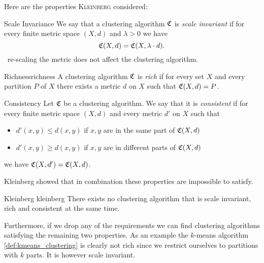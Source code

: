 Here are the properties \textsc{Kleinberg} considered:

\begin{definition}{Scale Invariance}{}
We say that a clustering algorithm $\mathfrak{C}$ is \emph{scale invariant} if for every finite metric space $(X,d)$ and $\lambda > 0$ we have
$$
\mathfrak{C}(X,d) = \mathfrak{C}(X, \lambda \cdot d).
$$
\Ie\ re-scaling the metric does not affect the clustering algorithm.
\end{definition}

\begin{definition}{Richness}{richness}
A clustering algorithm $\mathfrak{C}$ is \emph{rich} if for every set $X$ and every partition $P$ of $X$ there exists a metric $d$ on $X$ such that $\mathfrak{C}(X,d) = P$.
\end{definition}

\begin{definition}{Consistency}{}
Let $\mathfrak{C}$ be a clustering algorithm. We say that it is \emph{consistent} if for every finite metric space $(X,d)$ and every metric $d'$ on $X$ such that
\begin{itemize}
    \item $d'(x,y) \leq d(x,y)$ if $x,y$ are in the same part of $\mathfrak{C}(X,d)$
    \item $d'(x,y) \geq d(x,y)$ if $x,y$ are in different parts of $\mathfrak{C}(X,d)$
\end{itemize}
we have $\mathfrak{C}(X,d') = \mathfrak{C}(X,d)$.
\end{definition}

Kleinberg showed that in combination these properties are impossible to satisfy.

\begin{theorem}{Kleinberg \cite[Thm.~2.1]{Kleinberg2002}}{kleinberg}
There exists no clustering algorithm that is scale invariant, rich and consistent at the same time.
\end{theorem}

Furthermore, if we drop any of the requirements we can find clustering algorithms satisfying the remaining two properties. As an example the $k$-means algorithm \ref{def:kmeans_clustering} is clearly not rich since we restrict ourselves to partitions with $k$ parts. It is however scale invariant.


